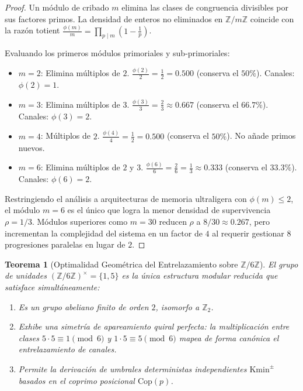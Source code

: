 \documentclass{article}
\numberwithin{equation}{section}
\theoremstyle{plain}
\newtheorem{theorem}{Teorema}[section]
\theoremstyle{definition}
\begin{document}
\begin{proof}
Un módulo de cribado $m$ elimina las clases de congruencia divisibles por sus factores primos. La densidad de enteros no eliminados en $\mathbb{Z}/m\mathbb{Z}$ coincide con la razón totient $\frac{\phi(m)}{m} = \prod_{p \mid m} \left(1 - \frac{1}{p}\right)$.

Evaluando los primeros módulos primoriales y sub-primoriales:
\begin{itemize}
    \item $m=2$: Elimina múltiplos de $2$. $\frac{\phi(2)}{2} = \frac{1}{2} = 0.500$ (conserva el $50\%$). Canales: $\phi(2)=1$.
    \item $m=3$: Elimina múltiplos de $3$. $\frac{\phi(3)}{3} = \frac{2}{3} \approx 0.667$ (conserva el $66.7\%$). Canales: $\phi(3)=2$.
    \item $m=4$: Múltiplos de $2$. $\frac{\phi(4)}{4} = \frac{1}{2} = 0.500$ (conserva el $50\%$). No añade primos nuevos.
    \item $m=6$: Elimina múltiplos de $2$ y $3$. $\frac{\phi(6)}{6} = \frac{2}{6} = \frac{1}{3} \approx 0.333$ (conserva el $33.3\%$). Canales: $\phi(6)=2$.
\end{itemize}
Restringiendo el análisis a arquitecturas de memoria ultraligera con $\phi(m) \le 2$, el módulo $m = 6$ es el único que logra la menor densidad de supervivencia $\rho = 1/3$. Módulos superiores como $m = 30$ reducen $\rho$ a $8/30 \approx 0.267$, pero incrementan la complejidad del sistema en un factor de $4$ al requerir gestionar $8$ progresiones paralelas en lugar de $2$.
\end{proof}

\begin{theorem}[Optimalidad Geométrica del Entrelazamiento sobre $\mathbb{Z}/6\mathbb{Z}$]
\label{thm:optimalidad-entrelazamiento-Z6}
El grupo de unidades $(\mathbb{Z}/6\mathbb{Z})^\times = \{1, 5\}$ es la única estructura modular reducida que satisface simultáneamente:
\begin{enumerate}
    \item Es un grupo abeliano finito de orden $2$, isomorfo a $\mathbb{Z}_2$.
    \item Exhibe una simetría de apareamiento quiral perfecta: la multiplicación entre clases $5 \cdot 5 \equiv 1 \pmod 6$ y $1 \cdot 5 \equiv 5 \pmod 6$ mapea de forma canónica el entrelazamiento de canales.
    \item Permite la derivación de umbrales deterministas independientes $\mathrm{Kmin}^\pm$ basados en el coprimo posicional $\mathrm{Cop}(p)$.
\end{enumerate}
\end{theorem}
\end{document}
